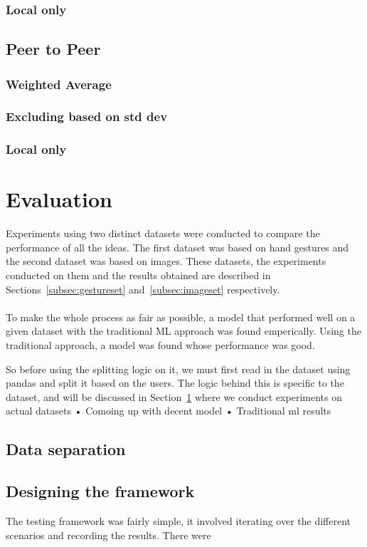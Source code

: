 \documentclass[12pt]{article}
\begin{document}
\subsubsection{Local only}
\subsection{Peer to Peer}
\subsubsection{Weighted Average}
\subsubsection{Excluding based on std dev}
\subsubsection{Local only}
\clearpage

\section{Evaluation}\label{sec:experiments}
Experiments using two distinct datasets were conducted to compare the performance of all the ideas. The first dataset was based on hand gestures and the second dataset was based on images. These datasets, the experiments conducted on them and the results obtained are described in Sections~\ref{subsec:gestureset} and~\ref{subsec:imageset} respectively.
\\\\
To make the whole process as fair as possible, a model that performed well on a given dataset with the traditional ML approach was found emperically. Using the traditional approach, a model was found whose performance was good.


So before using the splitting logic on it, we must first read in the dataset using pandas and split it based on the users. The logic behind this is specific to the dataset, and will be discussed in Section~\ref{sec:experiments} where we conduct experiments on actual datasets
• Comoing up with decent model
• Traditional ml results
\subsection{Data separation}\label{subsec:datasep}

\subsection{Designing the framework}
The testing framework was fairly simple, it involved iterating over the different scenarios and recording the results. There were 
\end{document}
